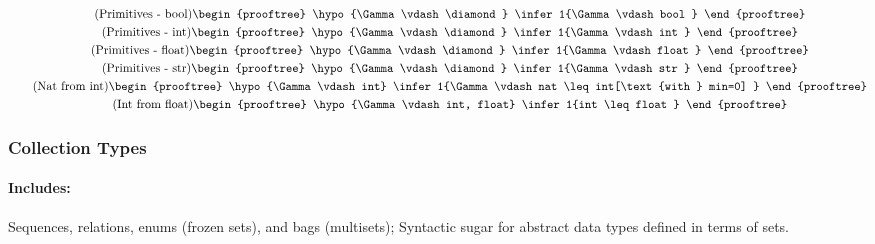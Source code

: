 \begin{gather}
\tag{Primitives - bool}
\begin{prooftree}
\hypo{\Gamma \vdash \diamond}
\infer1{\Gamma \vdash bool }
\end{prooftree}
\\
\tag{Primitives - int}
\begin{prooftree}
\hypo{\Gamma \vdash \diamond}
\infer1{\Gamma \vdash int }
\end{prooftree}
\\
\tag{Primitives - float}
\begin{prooftree}
\hypo{\Gamma \vdash \diamond}
\infer1{\Gamma \vdash float }
\end{prooftree}
\\
\tag{Primitives - str}
\begin{prooftree}
\hypo{\Gamma \vdash \diamond}
\infer1{\Gamma \vdash str }
\end{prooftree}
\\
\tag{Nat from int}
\begin{prooftree}
\hypo{\Gamma \vdash int}
\infer1{\Gamma \vdash nat \leq int[\text{with } min=0] }
\end{prooftree}
\\
\tag{Int from float}
\begin{prooftree}
\hypo{\Gamma \vdash int, float}
\infer1{int \leq float }
\end{prooftree}
\end{gather}

\subsubsection{Collection Types}
\paragraph{Includes:} Sequences, relations, enums (frozen sets), and bags (multisets); Syntactic sugar for abstract data types defined in terms of sets.

